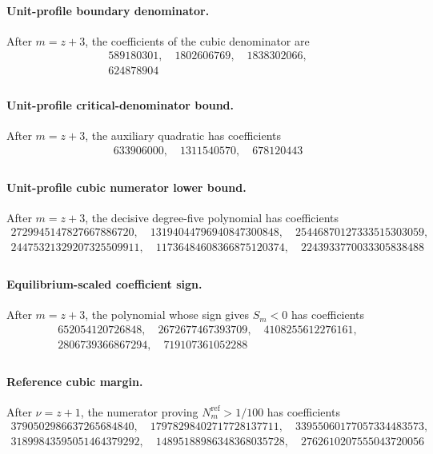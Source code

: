 \paragraph{Unit-profile boundary denominator.} After $m=z+3$, the coefficients of the cubic denominator are
\[
\begin{gathered}
589180301,\quad 1802606769,\quad 1838302066,\\
624878904\\
\end{gathered}
\]

\paragraph{Unit-profile critical-denominator bound.} After $m=z+3$, the auxiliary quadratic has coefficients
\[
\begin{gathered}
633906000,\quad 1311540570,\quad 678120443\\
\end{gathered}
\]

\paragraph{Unit-profile cubic numerator lower bound.} After $m=z+3$, the decisive degree-five polynomial has coefficients
\[
\begin{gathered}
2729945147827667886720,\quad 13194044796940847300848,\quad 25446870127333515303059,\\
24475321329207325509911,\quad 11736484608366875120374,\quad 2243933770033305838488\\
\end{gathered}
\]

\paragraph{Equilibrium-scaled coefficient sign.} After $m=z+3$, the polynomial whose sign gives $S_m<0$ has coefficients
\[
\begin{gathered}
652054120726848,\quad 2672677467393709,\quad 4108255612276161,\\
2806739366867294,\quad 719107361052288\\
\end{gathered}
\]

\paragraph{Reference cubic margin.} After $\nu=z+1$, the numerator proving $N_m^{\mathrm{ref}}>1/100$ has coefficients
\[
\begin{gathered}
3790502986637265684840,\quad 17978298402717728137711,\quad 33955060177057334483573,\\
31899843595051464379292,\quad 14895188986348368035728,\quad 2762610207555043720056\\
\end{gathered}
\]

